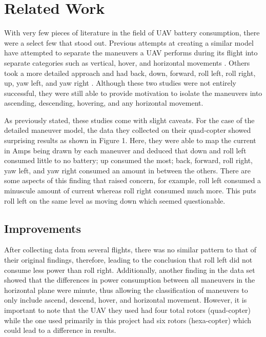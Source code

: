 \documentclass{article}
\begin{document}
\section{Related Work}
With very few pieces of literature in the field of UAV battery consumption, there were a select few that stood out. Previous attempts at creating a similar model have attempted to separate the maneuvers a UAV performs during its flight into separate categories such as vertical, hover, and horizontal movements \cite{Prasetia}. Others took a more detailed approach and had back, down, forward, roll left, roll right, up, yaw left, and yaw right \cite{Corral}. Although these two studies were not entirely successful, they were still able to provide motivation to isolate the maneuvers into ascending, descending, hovering, and any horizontal movement.\par

As previously stated, these studies come with slight caveats. For the case of the detailed maneuver model, the data they collected on their quad-copter showed surprising results as shown in Figure 1. Here, they were able to map the current in Amps being drawn by each maneuver and deduced that down and roll left consumed little to no battery; up consumed the most; back, forward, roll right, yaw left, and yaw right consumed an amount in between the others. There are some aspects of this finding that raised concern, for example, roll left consumed a minuscule amount of current whereas roll right consumed much more. This puts roll left on the same level as moving down which seemed questionable. \par


\subsection{Improvements}
After collecting data from several flights, there was no similar pattern to that of their original findings, therefore, leading to the conclusion that roll left did not consume less power than roll right. Additionally, another finding in the data set showed that the differences in power consumption between all maneuvers in the horizontal plane were minute, thus allowing the classification of maneuvers to only include ascend, descend, hover, and horizontal movement. However, it is important to note that the UAV they used had four total rotors (quad-copter) while the one used primarily in this project had six rotors (hexa-copter) which could lead to a difference in results.
\end{document}
